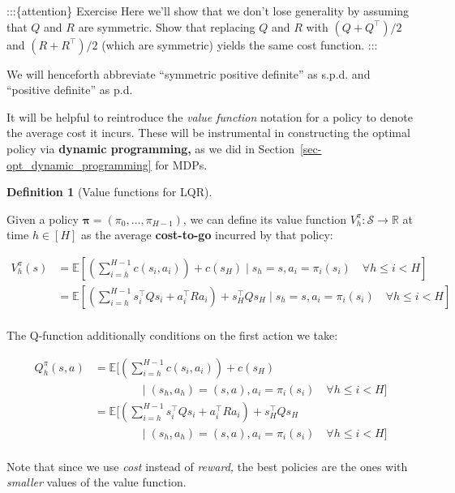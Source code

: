 \documentclass[
  letterpaper,
  DIV=11,
  numbers=noendperiod]{scrreprt}
\theoremstyle{plain}
\theoremstyle{plain}
\theoremstyle{definition}
\theoremstyle{definition}
\newtheorem{definition}{Definition}[chapter]
\theoremstyle{remark}
\begin{document}
:::\{attention\} Exercise Here we'll show that we don't lose generality
by assuming that \(Q\) and \(R\) are symmetric. Show that replacing
\(Q\) and \(R\) with \((Q + Q^\top) / 2\) and \((R + R^\top) / 2\)
(which are symmetric) yields the same cost function. :::

We will henceforth abbreviate ``symmetric positive definite'' as s.p.d.
and ``positive definite'' as p.d.

It will be helpful to reintroduce the \emph{value function} notation for
a policy to denote the average cost it incurs. These will be
instrumental in constructing the optimal policy via \textbf{dynamic
programming,} as we did in Section~\ref{sec-opt_dynamic_programming} for
MDPs.

\begin{definition}[Value functions for
LQR]\protect\hypertarget{def-value_lqr}{}\label{def-value_lqr}

Given a policy \(\mathbf{\pi} = (\pi_0, \dots, \pi_{H-1})\), we can
define its value function \(V^\pi_h: \mathcal{S} \to \mathbb{R}\) at
time \(h\in [H]\) as the average \textbf{cost-to-go} incurred by that
policy:

\[
\begin{split}
    V^\pi_h(s) &= \mathbb{E}\left[ \left( \sum_{i=h}^{H-1} c(s_i, a_i) \right) + c(s_H) \mid s_h= s,  a_i = \pi_i(s_i) \quad \forall h\le i < H \right] \\
    &= \mathbb{E}\left[ \left( \sum_{i=h}^{H-1} s_i^\top Q s_i + a_i^\top R a_i \right) + s_H^\top Q s_H\mid s_h= s, a_i = \pi_i(s_i) \quad \forall h\le i < H \right] \\
\end{split}
\]

The Q-function additionally conditions on the first action we take:

\[
\begin{split}
    Q^\pi_h(s, a) &= \mathbb{E}\bigg[ \left( \sum_{i=h}^{H-1} c(s_i, a_i) \right) + c(s_H) \\
        &\qquad\qquad \mid  (s_h, a_h) = (s, a), a_i = \pi_i(s_i) \quad \forall h\le i < H \bigg] \\
    &= \mathbb{E}\bigg[ \left( \sum_{i=h}^{H-1} s_i^\top Q s_i + a_i^\top R a_i \right) + s_H^\top Q s_H\\
        &\qquad\qquad \mid (s_h, a_h) = (s, a), a_i = \pi_i(s_i) \quad \forall h\le i < H \bigg] \\
\end{split}
\]

Note that since we use \emph{cost} instead of \emph{reward,} the best
policies are the ones with \emph{smaller} values of the value function.

\end{definition}
\end{document}
